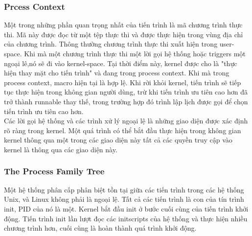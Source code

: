 \documentclass[a4paper,10pt]{report}
\begin{document}
\subsubsection{Prcess Context}
Một trong những phần quan trọng nhất của tiến trình là mã chương trình thực thi. Mã này được đọc từ một tệp thực thi và được thực hiện trong vùng địa chỉ của chương trình. Thông thường chương trình thực thi xuất hiện trong user-space. Khi mà một chương trình thực thi một lời gọi hệ thống hoặc triggers một ngoại lê,nó sẽ đi vào kernel-space. Tại thời điểm này, kernel được cho là "thực hiện thay mặt cho tiến trình" và đang trong process context. Khi mà trong process context, macro hiện tại là hợp lệ. Khi rời khỏi kernel, tiến trình sẽ tiếp tục thực hiện trong không gian người dùng, trừ khi tiến trình ưu tiên cao hơn đã trở thành runnable thay thế, trong trường hợp đó trình lập lịch được gọi để chọn tiến trình ưu tiên cao hơn. \\

Các lời gọi hệ thống và các trình xử lý ngoại lệ là những giao diện được xác định rõ ràng trong kernel. Một quá trình có thể bắt đầu thực hiện trong không gian kernel thông qua một trong các giao diện này tất cả các quyền truy cập vào kernel là thông qua các giao diện này.
\subsubsection{The Process Family Tree}
Một hệ thống phân cấp phân biệt tồn tại giữa các tiến trình trong các hệ thống Unix, và Linux không phải là ngoại lệ. Tất cả các tiến trình là con của tín trình init, PID của nó là một. Kernel bắt đầu init ở bước cuối cùng của tiến trình khởi động. Tiến trình init lần lượt đọc các initscripts của hệ thống và thực hiện nhiều chương trình hơn, cuối cùng là hoàn thành quá trình khởi động. \\
\end{document}
